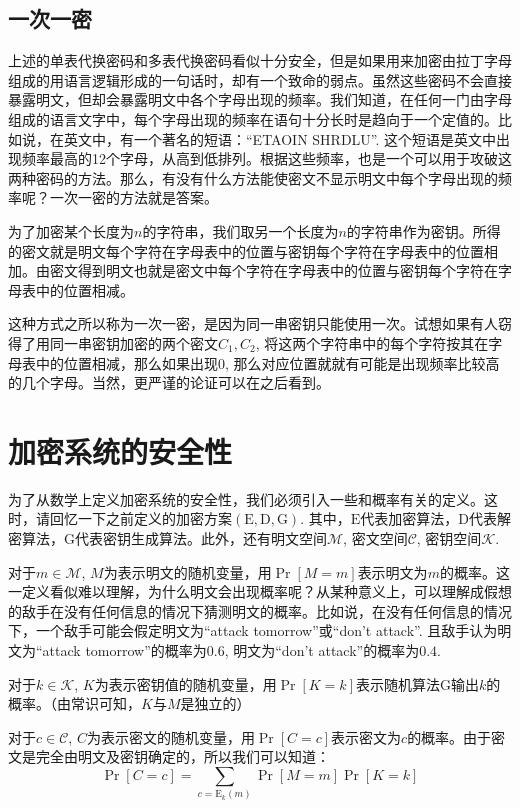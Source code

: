 \documentclass[UTF8]{ctexrep}
\def\pth#1{\left( {#1}\right)}
\def\brack#1{\left[ {#1}\right]}
\def\E#1#2{{\mathrm{E}_{#1}\left({#2}\right)}}
\begin{document}
\subsection{一次一密}
上述的单表代换密码和多表代换密码看似十分安全，但是如果用来加密由拉丁字母组成的用语言逻辑形成的一句话时，却有一个致命的弱点。虽然这些密码不会直接暴露明文，但却会暴露明文中各个字母出现的频率。我们知道，在任何一门由字母组成的语言文字中，每个字母出现的频率在语句十分长时是趋向于一个定值的。比如说，在英文中，有一个著名的短语：``ETAOIN SHRDLU''. 这个短语是英文中出现频率最高的12个字母，从高到低排列。根据这些频率，也是一个可以用于攻破这两种密码的方法。那么，有没有什么方法能使密文不显示明文中每个字母出现的频率呢？一次一密的方法就是答案。\par
为了加密某个长度为$n$的字符串，我们取另一个长度为$n$的字符串作为密钥。所得的密文就是明文每个字符在字母表中的位置与密钥每个字符在字母表中的位置相加。由密文得到明文也就是密文中每个字符在字母表中的位置与密钥每个字符在字母表中的位置相减。\par
这种方式之所以称为一次一密，是因为同一串密钥只能使用一次。试想如果有人窃得了用同一串密钥加密的两个密文$C_1, C_2$, 将这两个字符串中的每个字符按其在字母表中的位置相减，那么如果出现$0$, 那么对应位置就就有可能是出现频率比较高的几个字母。当然，更严谨的论证可以在之后看到。
\section{加密系统的安全性}
为了从数学上定义加密系统的安全性，我们必须引入一些和概率有关的定义。这时，请回忆一下之前定义的加密方案$\pth{\mathrm{E}, \mathrm{D}, \mathrm{G}}$. 其中，$\mathrm{E}$代表加密算法，$\mathrm{D}$代表解密算法，$\mathrm{G}$代表密钥生成算法。此外，还有明文空间$\mathcal{M}$, 密文空间$\mathcal{C}$, 密钥空间$\mathcal{K}$.\par
对于$m\in\mathcal{M}$, $M$为表示明文的随机变量，用$\Pr\brack{M=m}$表示明文为$m$的概率。这一定义看似难以理解，为什么明文会出现概率呢？从某种意义上，可以理解成假想的敌手在没有任何信息的情况下猜测明文的概率。比如说，在没有任何信息的情况下，一个敌手可能会假定明文为``attack tomorrow''或``don't attack''. 且敌手认为明文为``attack tomorrow''的概率为$0.6$, 明文为``don't attack''的概率为$0.4$.\par
对于$k\in\mathcal{K}$, $K$为表示密钥值的随机变量，用$\Pr\brack{K=k}$表示随机算法$\mathrm{G}$输出$k$的概率。（由常识可知，$K$与$M$是独立的）\par
对于$c\in\mathcal{C}$, $C$为表示密文的随机变量，用$\Pr\brack{C=c}$表示密文为$c$的概率。由于密文是完全由明文及密钥确定的，所以我们可以知道：
\begin{equation}
    \Pr\brack{C=c}=\sum_{c=\E{k}{m}} \Pr\brack{M=m}\Pr\brack{K=k}
\end{equation}
\end{document}
